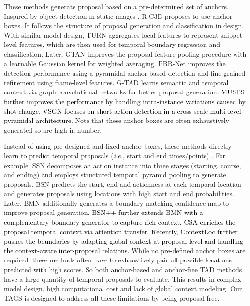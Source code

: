 \documentclass[runningheads]{llncs}
\newcommand{\ie}{\textit{i.e.}}
\newcommand{\shortmodelname}{TAGS}
\begin{document}
These methods generate proposal based on a pre-determined set of anchors. Inspired by object detection in static images \cite{ren2016faster},
R-C3D \cite{xu2017r} proposes to use anchor boxes.
It follows the structure of {proposal generation and classification} in design.
With similar model design, TURN \cite{gao2017turn} aggregates local features to represent snippet-level features, which are then used for temporal boundary regression and classification.
Later, GTAN \cite{long2019gaussian}
improves the proposal feature pooling procedure with a learnable Gaussian kernel for weighted averaging.
PBR-Net \cite{liu2020progressive} improves the detection performance using a pyramidal anchor based detection and fine-grained refinement using frame-level features.
G-TAD \cite{xu2020g}
learns semantic and temporal context via graph convolutional networks for better proposal generation. 
\textcolor{black}{
MUSES \cite{liu2021multi} further improves the performance by handling intra-instance variations caused by shot change.
VSGN \cite{zhao2021video} focuses on short-action detection in a cross-scale multi-level pyramidal architecture.}
Note that these anchor boxes are often exhaustively generated so are high in number.

Instead of using pre-designed and fixed anchor boxes, these methods directly learn to predict temporal proposals (\ie, start and end times/points) 
\cite{zhao2017temporal,lin2018bsn,lin2019bmn}.
For example, SSN \cite{zhao2017temporal} decomposes an action instance into three stages (starting, course, and ending)
and employs structured temporal pyramid pooling
to generate proposals.
BSN \cite{lin2018bsn} predicts the start, end and actionness at each temporal location and generates proposals using locations with high start and end probabilities.
Later, BMN \cite{lin2019bmn}
additionally generates a boundary-matching confidence map to improve proposal generation. 
\textcolor{black}{BSN++ \cite{su2020bsn++} further extends BMN with a complementary boundary generator to capture rich context.
CSA \cite{sridhar2021class} enriches the proposal temporal context via attention transfer. 
Recently, ContextLoc \cite{zhu2021enriching} further pushes the boundaries by adapting global context at proposal-level and handling the context-aware inter-proposal relations.}
While no pre-defined anchor boxes are required, these methods often have to exhaustively
pair all possible locations predicted with high scores.
So both anchor-based and anchor-free TAD methods
have a large quantity of temporal proposals to evaluate. This results in complex model design, high computational cost and lack of global context modeling. 
Our {\shortmodelname} is designed to address all these limitations by being proposal-free.
\end{document}
